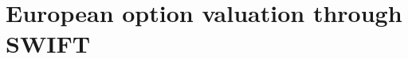 \documentclass[12,twoside]{mammeTFM}
\newtheorem{lem}[thm]{Lemma}
\theoremstyle{definition}
\theoremstyle{remark}
\begin{document}






\section{European option valuation through SWIFT}\label{chap:big_swift}
\end{document}
